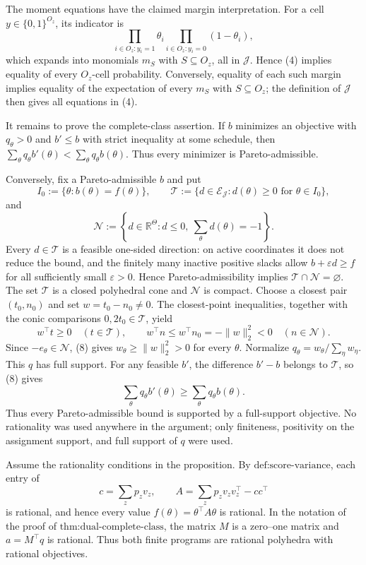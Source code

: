 The moment equations have the claimed margin interpretation.  For a cell \(y\in\{0,1\}^{O_z}\), its indicator is
\[
 \prod_{i\in O_z:y_i=1}\theta_i
 \prod_{i\in O_z:y_i=0}(1-\theta_i),
\]
which expands into monomials \(m_S\) with \(S\subseteq O_z\), all in \(\mathcal J\).  Hence (4) implies equality of every \(O_z\)-cell probability.  Conversely, equality of each such margin implies equality of the expectation of every \(m_S\) with \(S\subseteq O_z\); the definition of \(\mathcal J\) then gives all equations in (4).

It remains to prove the complete-class assertion.  If \(b\) minimizes an objective with \(q_\theta>0\) and \(b'\le b\) with strict inequality at some schedule, then \(\sum_\theta q_\theta b'(\theta)<\sum_\theta q_\theta b(\theta)\).  Thus every minimizer is Pareto-admissible.

Conversely, fix a Pareto-admissible \(b\) and put
\[
 I_0:=\{\theta:b(\theta)=f(\theta)\},\quad\quad
 \mathcal T:=\{d\in\mathcal E_{\mathcal J}:d(\theta)\ge0\text{ for }\theta\in I_0\},
\]
and
\[
 \mathcal N:=\left\{d\in\mathbb R^\Theta:d\le0,
              \ \sum_\theta d(\theta)=-1\right\}.
\]
Every \(d\in\mathcal T\) is a feasible one-sided direction: on active coordinates it does not reduce the bound, and the finitely many inactive positive slacks allow \(b+\varepsilon d\ge f\) for all sufficiently small \(\varepsilon>0\).  Hence Pareto-admissibility implies \(\mathcal T\cap\mathcal N=\varnothing\).  The set \(\mathcal T\) is a closed polyhedral cone and \(\mathcal N\) is compact.  Choose a closest pair \((t_0,n_0)\) and set \(w=t_0-n_0\ne0\).  The closest-point inequalities, together with the conic comparisons \(0,2t_0\in\mathcal T\), yield
\[
 w^\top t\ge0\quad(t\in\mathcal T),\quad\quad
 w^\top n\le w^\top n_0=-\|w\|_2^2<0\quad(n\in\mathcal N). \tag{8}
\]
Since \(-e_\theta\in\mathcal N\), (8) gives \(w_\theta\ge\|w\|_2^2>0\) for every \(\theta\).  Normalize \(q_\theta=w_\theta/\sum_\eta w_\eta\).  This \(q\) has full support.  For any feasible \(b'\), the difference \(b'-b\) belongs to \(\mathcal T\), so (8) gives
\[
 \sum_\theta q_\theta b'(\theta)\ge
 \sum_\theta q_\theta b(\theta).
\]
Thus every Pareto-admissible bound is supported by a full-support objective.  No rationality was used anywhere in the argument; only finiteness, positivity on the assignment support, and full support of \(q\) were used.

Assume the rationality conditions in the proposition.  By \(\text{def:score-variance}\), each entry of
\[
 c=\sum_zp_zv_z,\quad\quad
 A=\sum_zp_zv_zv_z^\top-cc^\top
\]
is rational, and hence every value \(f(\theta)=\theta^\top A\theta\) is rational.  In the notation of the proof of \(\text{thm:dual-complete-class}\), the matrix \(M\) is a zero--one matrix and \(a=M^\top q\) is rational.  Thus both finite programs are rational polyhedra with rational objectives.

